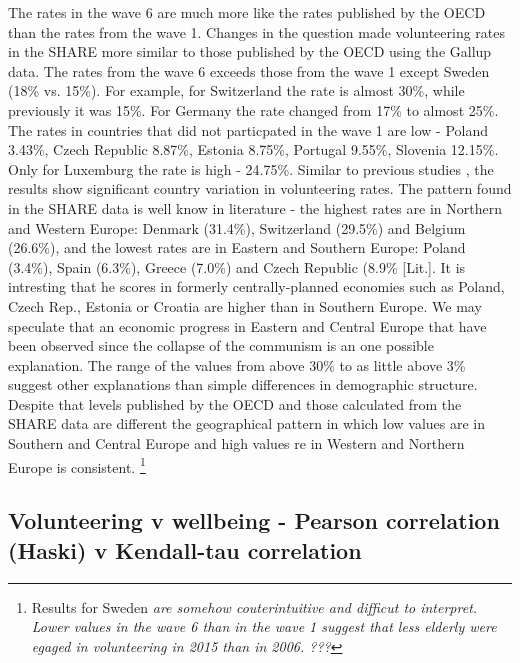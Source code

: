 \documentclass[10pt, letterpaper]{article}
\begin{document}
\begin{spacing}{1.4}
\begin{spacing}{.9}
	 
      \label{OECDSHARE} 
\end{spacing}

The rates in the wave 6 are much more like the rates published by the OECD than the rates from the wave 1. Changes in the question made volunteering rates in the SHARE more similar to those published by the OECD using the Gallup data. The rates from the wave 6 exceeds those from the wave 1 except Sweden (18\% vs. 15\%).  For example, for Switzerland the rate is almost 30\%, while previously it was 15\%. For Germany the rate changed from 17\% to almost 25\%. The rates in countries that did not particpated in the wave 1 are low - Poland 3.43\%, Czech Republic 8.87\%, Estonia 8.75\%, Portugal 9.55\%, Slovenia 12.15\%. Only for Luxemburg the rate is high - 24.75\%. Similar to previous studies , the results show significant country variation in volunteering rates. The pattern found in the SHARE data is well know in literature - the highest rates are in Northern and Western Europe:  Denmark (31.4\%), Switzerland (29.5\%) and Belgium (26.6\%), and the lowest rates are in Eastern and Southern Europe: Poland (3.4\%), Spain (6.3\%), Greece (7.0\%) and Czech Republic (8.9\% [Lit.]. It is intresting that he scores in formerly centrally-planned economies such as Poland, Czech Rep., Estonia or Croatia are higher than in Southern Europe. We may speculate that an economic progress in Eastern and Central Europe that have been observed since the collapse of the communism is an one possible explanation. The range of the values from above 30\% to as little above 3\% suggest other explanations than simple differences in demographic structure.   Despite that levels published by the OECD and those calculated from the SHARE data are different the geographical pattern in which low values are in Southern and Central Europe and high values re in  Western and Northern Europe is consistent. \footnote{Results for Sweden \textit{are somehow couterintuitive and difficut to interpret. Lower values in the wave 6 than in the wave 1 suggest that less elderly were egaged in volunteering in 2015 than in 2006. ??? }} \\



\subsection*{Volunteering v wellbeing - Pearson correlation (Haski) v Kendall-tau correlation}


\end{spacing}
\end{document}
